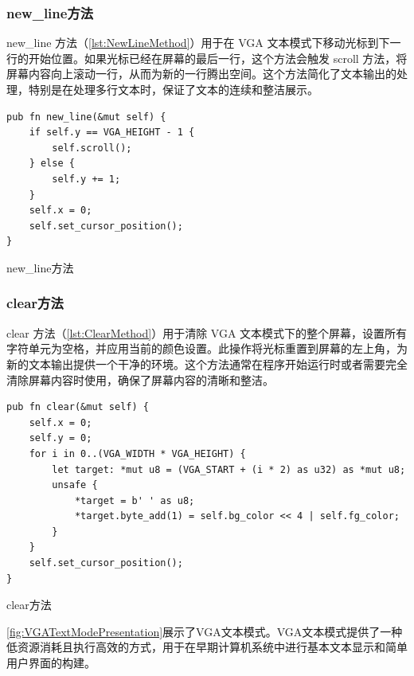 \subsubsection{new\_line方法}

new\_line 方法（\cref{lst:NewLineMethod}）用于在 VGA 文本模式下移动光标到下一行的开始位置。如果光标已经在屏幕的最后一行，这个方法会触发 scroll 方法，将屏幕内容向上滚动一行，从而为新的一行腾出空间。这个方法简化了文本输出的处理，特别是在处理多行文本时，保证了文本的连续和整洁展示。

\begin{listing}[htbp]
    \begin{verbatim}
pub fn new_line(&mut self) {
    if self.y == VGA_HEIGHT - 1 {
        self.scroll();
    } else {
        self.y += 1;
    }
    self.x = 0;
    self.set_cursor_position();
}
    \end{verbatim}
    \caption{new\_line方法}\label{lst:NewLineMethod}
\end{listing}

\subsubsection{clear方法}

clear 方法（\cref{lst:ClearMethod}）用于清除 VGA 文本模式下的整个屏幕，设置所有字符单元为空格，并应用当前的颜色设置。此操作将光标重置到屏幕的左上角，为新的文本输出提供一个干净的环境。这个方法通常在程序开始运行时或者需要完全清除屏幕内容时使用，确保了屏幕内容的清晰和整洁。

\begin{listing}[htbp]
    \begin{verbatim}
pub fn clear(&mut self) {
    self.x = 0;
    self.y = 0;
    for i in 0..(VGA_WIDTH * VGA_HEIGHT) {
        let target: *mut u8 = (VGA_START + (i * 2) as u32) as *mut u8;
        unsafe {
            *target = b' ' as u8;
            *target.byte_add(1) = self.bg_color << 4 | self.fg_color;
        }
    }
    self.set_cursor_position();
}
    \end{verbatim}
    \caption{clear方法}\label{lst:ClearMethod}
\end{listing}

\cref{fig:VGATextModePresentation}展示了VGA文本模式。VGA文本模式提供了一种低资源消耗且执行高效的方式，用于在早期计算机系统中进行基本文本显示和简单用户界面的构建。

